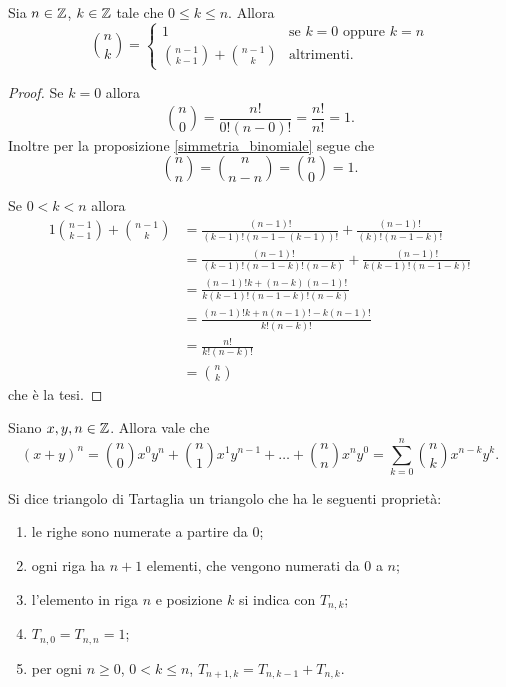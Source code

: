 \begin{proposition} \label{binomiale_ricorsivo}
    Sia $n \in \mathbb{Z}$, $k \in \mathbb{Z}$ tale che $0 \leq k \leq n$. Allora \begin{equation}
        \binom{n}{k} = \begin{cases}
            1 &\text{se } k = 0 \text{ oppure } k = n \\
            \binom{n - 1}{k - 1} + \binom{n - 1}{k} &\text{altrimenti}.
        \end{cases}
    \end{equation}
\end{proposition}
\begin{proof}
    Se $k = 0$ allora \[\binom{n}{0} = \frac{n!}{0!(n-0)!} = \frac{n!}{n!} = 1.\] 
    Inoltre per la proposizione \ref{simmetria_binomiale} segue che \[\binom{n}{n} = \binom{n}{n - n} = \binom{n}{0} = 1.\]

    Se $0 < k < n$ allora \begin{alignat*}
        {1}
        \binom{n - 1}{k - 1} + \binom{n - 1}{k} &= \frac{(n-1)!}{(k-1)!(n-1-(k-1))!} + \frac{(n-1)!}{(k)!(n-1-k)!} \\[1em]
        &= \frac{(n-1)!}{(k-1)!(n-1-k)!(n-k)} + \frac{(n-1)!}{k(k-1)!(n-1-k)!} \\[1em]
        &= \frac{(n-1)!k + (n-k)(n-1)!}{k(k-1)!(n-1-k)!(n-k)} \\[1em]
        &= \frac{(n-1)!k + n(n-1)! - k(n-1)!}{k!(n-k)!} \\
        &= \frac{n!}{k!(n-k)!} \\[1em]
        &= \binom{n}{k}
    \end{alignat*}
    che è la tesi.
\end{proof}

\begin{theorem} \label{binomiale}
    Siano $x, y, n \in \mathbb{Z}$. Allora vale che
    \begin{equation}
        (x+y)^n = \binom{n}{0}x^0y^n + \binom{n}{1}x^1y^{n-1} + \dots + \binom{n}{n}x^ny^0 = \sum_{k=0}^n \binom{n}{k}x^{n-k}y^k.
    \end{equation}
\end{theorem}

\begin{definition}
    Si dice triangolo di Tartaglia un triangolo che ha le seguenti proprietà:
    \begin{enumerate}
        \item le righe sono numerate a partire da $0$;
        \item ogni riga ha $n + 1$ elementi, che vengono numerati da $0$ a $n$;
        \item l'elemento in riga $n$ e posizione $k$ si indica con $T_{n, k}$;
        \item $T_{n, 0} = T_{n, n} = 1$;
        \item per ogni $n \geq 0$, $0 < k \leq n$, $T_{n + 1, k} = T_{n, k - 1} + T_{n, k}$.
    \end{enumerate}
\end{definition}



